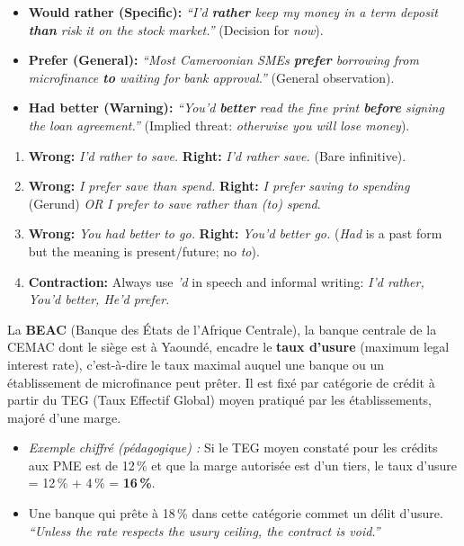 \documentclass[11pt]{article}
\begin{document}
\begin{exemplebox}
\begin{itemize}
    \item \textbf{Would rather (Specific):} \textit{``I'd \textbf{rather} keep my money in a term deposit \textbf{than} risk it on the stock market.''} (Decision for \textit{now}).
    \item \textbf{Prefer (General):} \textit{``Most Cameroonian SMEs \textbf{prefer} borrowing from microfinance \textbf{to} waiting for bank approval.''} (General observation).
    \item \textbf{Had better (Warning):} \textit{``You'd \textbf{better} read the fine print \textbf{before} signing the loan agreement.''} (Implied threat: \textit{otherwise you will lose money}).
\end{itemize}
\end{exemplebox}

\begin{attention}
\begin{enumerate}
    \item \textbf{Wrong:} \textit{I'd rather to save.} \quad \textbf{Right:} \textit{I'd rather save.} (Bare infinitive).
    \item \textbf{Wrong:} \textit{I prefer save than spend.} \quad \textbf{Right:} \textit{I prefer saving to spending} (Gerund) \textit{OR} \textit{I prefer to save rather than (to) spend}.
    \item \textbf{Wrong:} \textit{You had better to go.} \quad \textbf{Right:} \textit{You'd better go.} (\textit{Had} is a past form but the meaning is present/future; no \textit{to}).
    \item \textbf{Contraction:} Always use \textit{'d} in speech and informal writing: \textit{I'd rather, You'd better, He'd prefer}.
\end{enumerate}
\end{attention}

\begin{savaistu}
La \textbf{BEAC} (Banque des États de l'Afrique Centrale), la banque centrale de la CEMAC dont le siège est à Yaoundé, encadre le \textbf{taux d'usure} (maximum legal interest rate), c'est-à-dire le taux maximal auquel une banque ou un établissement de microfinance peut prêter. Il est fixé par catégorie de crédit à partir du TEG (Taux Effectif Global) moyen pratiqué par les établissements, majoré d'une marge.
\begin{itemize}
    \item \textit{Exemple chiffré (pédagogique) :} Si le TEG moyen constaté pour les crédits aux PME est de 12\,\% et que la marge autorisée est d'un tiers, le taux d'usure = 12\,\% + 4\,\% = \textbf{16\,\%}.
    \item Une banque qui prête à 18\,\% dans cette catégorie commet un délit d'usure. \textit{``Unless the rate respects the usury ceiling, the contract is void.''}
\end{itemize}
\end{savaistu}
\end{document}

